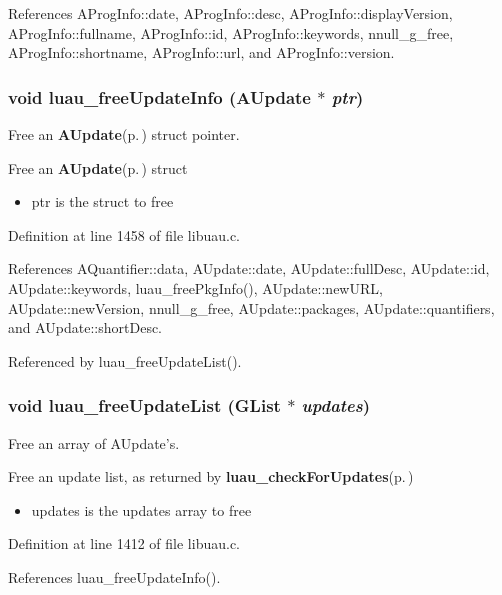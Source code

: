 References AProg\-Info::date, AProg\-Info::desc, AProg\-Info::display\-Version, AProg\-Info::fullname, AProg\-Info::id, AProg\-Info::keywords, nnull\_\-g\_\-free, AProg\-Info::shortname, AProg\-Info::url, and AProg\-Info::version.
\subsubsection{\setlength{\rightskip}{0pt plus 5cm}void luau\_\-free\-Update\-Info ({\bf AUpdate} $\ast$ {\em ptr})}\label{libuau_8h_a97}


Free an {\bf AUpdate}{\rm (p.\,\pageref{structAUpdate})} struct pointer. 

Free an {\bf AUpdate}{\rm (p.\,\pageref{structAUpdate})} struct

\begin{itemize}
\item ptr is the struct to free \end{itemize}


Definition at line 1458 of file libuau.c.

References AQuantifier::data, AUpdate::date, AUpdate::full\-Desc, AUpdate::id, AUpdate::keywords, luau\_\-free\-Pkg\-Info(), AUpdate::new\-URL, AUpdate::new\-Version, nnull\_\-g\_\-free, AUpdate::packages, AUpdate::quantifiers, and AUpdate::short\-Desc.

Referenced by luau\_\-free\-Update\-List().
\subsubsection{\setlength{\rightskip}{0pt plus 5cm}void luau\_\-free\-Update\-List (GList $\ast$ {\em updates})}\label{libuau_8h_a95}


Free an array of AUpdate's. 

Free an update list, as returned by {\bf luau\_\-check\-For\-Updates}{\rm (p.\,\pageref{libuau_8h_a53})}

\begin{itemize}
\item updates is the updates array to free \end{itemize}


Definition at line 1412 of file libuau.c.

References luau\_\-free\-Update\-Info().

